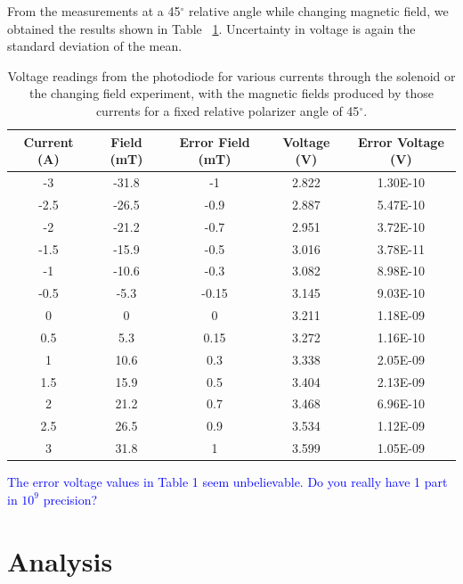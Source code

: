 \documentclass[prb,preprint]{revtex4-1}
\begin{document}
From the measurements at a 45$^{\circ}$ relative angle while changing magnetic field, we obtained the results shown in Table ~\ref{V_I_Table}. Uncertainty in voltage is again the standard deviation of the mean.

\begin{table}[h!]
\centering
\caption{Voltage readings from the photodiode for various currents through the solenoid or the changing field experiment, with the magnetic fields produced by those currents for a fixed relative polarizer angle of 45$^{\circ}$.}
\begin{ruledtabular}
\begin{tabular}{c c c c c}
Current (A) & Field (mT) & Error Field (mT) & Voltage (V) & Error Voltage (V)\\
\hline	%
-3   & -31.8 & -1 & 2.822 & 1.30E-10 \\
-2.5 & -26.5 & -0.9 & 2.887 & 5.47E-10 \\
-2   & -21.2 & -0.7 & 2.951 & 3.72E-10 \\
-1.5 & -15.9 & -0.5 & 3.016 & 3.78E-11 \\
-1   & -10.6 & -0.3 & 3.082 & 8.98E-10 \\
-0.5 & -5.3 & -0.15 & 3.145 & 9.03E-10 \\
0 & 0 & 0 & 3.211 & 1.18E-09 \\
0.5  & 5.3 & 0.15 & 3.272 & 1.16E-10 \\
1    & 10.6 & 0.3 & 3.338 & 2.05E-09 \\
1.5  & 15.9 & 0.5 & 3.404 & 2.13E-09 \\
2    & 21.2 & 0.7 & 3.468 & 6.96E-10 \\
2.5  & 26.5 & 0.9 & 3.534 & 1.12E-09 \\
3    & 31.8 & 1 & 3.599 & 1.05E-09
\end{tabular}
\end{ruledtabular}
\label{V_I_Table}
\end{table}

\textcolor{blue}{The error voltage values in Table 1 seem unbelievable. Do you really have 1 part in $10^9$ precision?} 

\section{Analysis}
\end{document}
